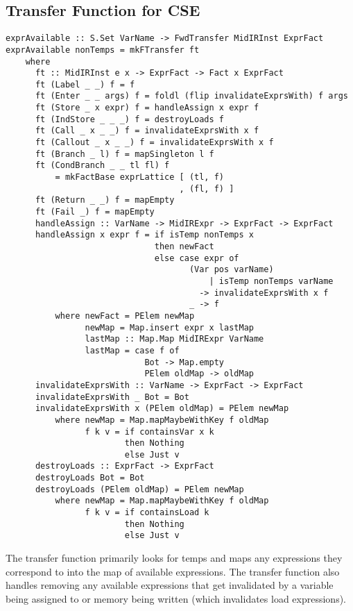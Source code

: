 \documentclass[11pt]{article}
\begin{document}
\subsection {Transfer Function for CSE}

\begin{verbatim}
exprAvailable :: S.Set VarName -> FwdTransfer MidIRInst ExprFact 
exprAvailable nonTemps = mkFTransfer ft 
    where
      ft :: MidIRInst e x -> ExprFact -> Fact x ExprFact 
      ft (Label _ _) f = f
      ft (Enter _ _ args) f = foldl (flip invalidateExprsWith) f args
      ft (Store _ x expr) f = handleAssign x expr f
      ft (IndStore _ _ _) f = destroyLoads f
      ft (Call _ x _ _) f = invalidateExprsWith x f
      ft (Callout _ x _ _) f = invalidateExprsWith x f 
      ft (Branch _ l) f = mapSingleton l f
      ft (CondBranch _ _ tl fl) f 
          = mkFactBase exprLattice [ (tl, f) 
                                   , (fl, f) ]
      ft (Return _ _) f = mapEmpty 
      ft (Fail _) f = mapEmpty 
      handleAssign :: VarName -> MidIRExpr -> ExprFact -> ExprFact
      handleAssign x expr f = if isTemp nonTemps x 
                              then newFact 
                              else case expr of  
                                     (Var pos varName) 
                                         | isTemp nonTemps varName 
                                       -> invalidateExprsWith x f
                                     _ -> f
          where newFact = PElem newMap 
                newMap = Map.insert expr x lastMap
                lastMap :: Map.Map MidIRExpr VarName
                lastMap = case f of
                            Bot -> Map.empty
                            PElem oldMap -> oldMap
      invalidateExprsWith :: VarName -> ExprFact -> ExprFact
      invalidateExprsWith _ Bot = Bot 
      invalidateExprsWith x (PElem oldMap) = PElem newMap 
          where newMap = Map.mapMaybeWithKey f oldMap 
                f k v = if containsVar x k
                        then Nothing
                        else Just v 
      destroyLoads :: ExprFact -> ExprFact 
      destroyLoads Bot = Bot 
      destroyLoads (PElem oldMap) = PElem newMap
          where newMap = Map.mapMaybeWithKey f oldMap
                f k v = if containsLoad k 
                        then Nothing
                        else Just v
\end{verbatim}

The transfer function primarily looks for temps and maps any expressions they correspond to into the map of available expressions. The transfer function also handles removing any available expressions that get invalidated by a variable being assigned to or memory being written (which invalidates load expressions). 
\end{document}
